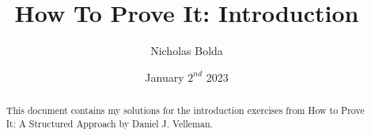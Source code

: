 \documentclass[12pt]{article}
\title{How To Prove It: Introduction}
\author{Nicholas Bolda}
\date{January \(2^{nd}\) 2023}
\begin{document}
\markboth{\theauthor}{\thetitle}

\maketitle

\begin{abstract}
    This document contains my solutions for the introduction exercises from How to Prove It: A Structured Approach by Daniel J. Velleman.
\end{abstract}

\end{document}
